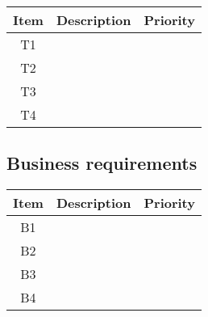 \begin{tabular}{|c|c|c|}
	\hline 
	Item & Description & Priority \\ 
	\hline 
	T1 &  &  \\ 
	\hline 
	T2 &  &  \\ 
	\hline 
	T3 &  &  \\ 
	\hline 
	T4 &  &  \\ 
	\hline 
\end{tabular} 


\subsection{Business requirements}

\begin{tabular}{|c|c|c|}
	\hline 
	Item & Description & Priority \\ 
	\hline 
	B1 &  &  \\ 
	\hline 
	B2 &  &  \\ 
	\hline 
	B3 &  &  \\ 
	\hline 
	B4 &  &  \\ 
	\hline 
\end{tabular} 

